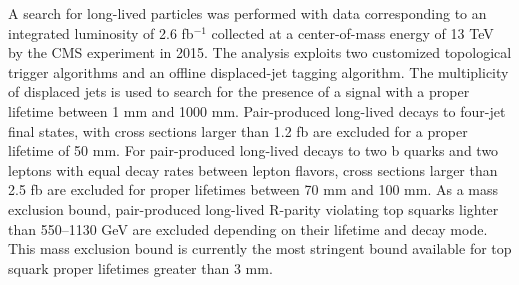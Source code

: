  A search for long-lived particles was performed with data corresponding to
 an integrated luminosity of 2.6 fb$^{-1}$ collected at a center-of-mass energy of 
13 TeV by the CMS experiment in 2015.  The analysis exploits two customized topological
 trigger algorithms and an offline displaced-jet tagging algorithm. The 
 multiplicity of displaced jets is used to search for the presence of a signal with a
 proper lifetime between 1 mm and 1000 mm.  Pair-produced long-lived decays to four-jet
 final states, with cross sections larger
 than 1.2 fb are excluded for a proper lifetime  of 50 mm. For pair-produced long-lived decays
 to two b quarks and two leptons with equal decay rates between lepton flavors,  cross
 sections larger than 2.5 fb are excluded for proper lifetimes between 70 mm and 100 mm. As a mass 
 exclusion bound, pair-produced long-lived R-parity violating top squarks lighter than
 550--1130 GeV are excluded depending on their lifetime and decay mode. This mass exclusion bound
 is currently the most stringent bound available for top squark proper lifetimes greater than 3 mm.

